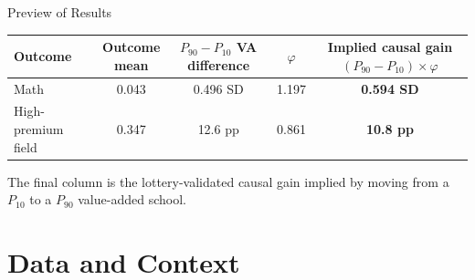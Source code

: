 \documentclass[11pt,aspectratio=169]{beamer}
\begin{document}
\begin{frame}{Preview of Results}
\centering
\scriptsize
\setlength{\tabcolsep}{5pt}
\renewcommand{\arraystretch}{1.35}
\begin{tabular}{lcccc}
\toprule
Outcome
& \shortstack{Outcome\\mean}
& \shortstack{$P_{90}-P_{10}$\\VA difference}
& $\varphi$
& \shortstack{Implied causal gain\\$(P_{90}-P_{10})\times\varphi$} \\
\midrule
Math & 0.043 & 0.496 SD & 1.197 & \textbf{0.594 SD} \\
High-premium field & 0.347 & 12.6 pp & 0.861 & \textbf{10.8 pp} \\
\bottomrule
\end{tabular}

\vspace{0.9em}
\footnotesize
 The final column is the lottery-validated causal gain implied by moving from a $P_{10}$ to a $P_{90}$ value-added school.
\end{frame}

\section{Data and Context}
\end{document}
